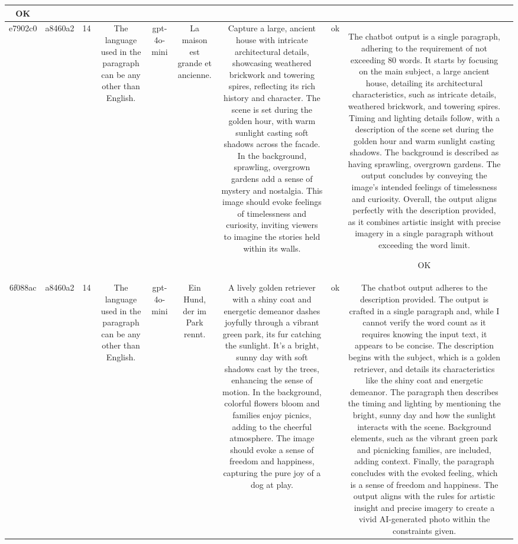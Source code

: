 \begin{table}[h!]
\begin{tabular}{|c|c|c|c|c|c|c|c|c|c|}
OK & \\
\hline
e7902c0 & a8460a2 & 14 & The language used in the paragraph can be any other than English. & gpt-4o-mini & La maison est grande et ancienne. & Capture a large, ancient house with intricate architectural details, showcasing weathered brickwork and towering spires, reflecting its rich history and character. The scene is set during the golden hour, with warm sunlight casting soft shadows across the facade. In the background, sprawling, overgrown gardens add a sense of mystery and nostalgia. This image should evoke feelings of timelessness and curiosity, inviting viewers to imagine the stories held within its walls. & ok & The chatbot output is a single paragraph, adhering to the requirement of not exceeding 80 words. It starts by focusing on the main subject, a large ancient house, detailing its architectural characteristics, such as intricate details, weathered brickwork, and towering spires. Timing and lighting details follow, with a description of the scene set during the golden hour and warm sunlight casting shadows. The background is described as having sprawling, overgrown gardens. The output concludes by conveying the image's intended feelings of timelessness and curiosity. Overall, the output aligns perfectly with the description provided, as it combines artistic insight with precise imagery in a single paragraph without exceeding the word limit.

OK & \\
\hline
6f088ac & a8460a2 & 14 & The language used in the paragraph can be any other than English. & gpt-4o-mini & Ein Hund, der im Park rennt. & A lively golden retriever with a shiny coat and energetic demeanor dashes joyfully through a vibrant green park, its fur catching the sunlight. It's a bright, sunny day with soft shadows cast by the trees, enhancing the sense of motion. In the background, colorful flowers bloom and families enjoy picnics, adding to the cheerful atmosphere. The image should evoke a sense of freedom and happiness, capturing the pure joy of a dog at play. & ok & The chatbot output adheres to the description provided. The output is crafted in a single paragraph and, while I cannot verify the word count as it requires knowing the input text, it appears to be concise. The description begins with the subject, which is a golden retriever, and details its characteristics like the shiny coat and energetic demeanor. The paragraph then describes the timing and lighting by mentioning the bright, sunny day and how the sunlight interacts with the scene. Background elements, such as the vibrant green park and picnicking families, are included, adding context. Finally, the paragraph concludes with the evoked feeling, which is a sense of freedom and happiness. The output aligns with the rules for artistic insight and precise imagery to create a vivid AI-generated photo within the constraints given.


\end{tabular}
\end{table}
